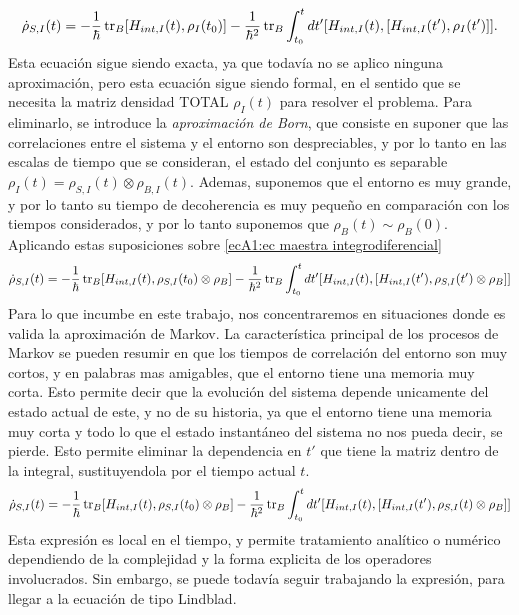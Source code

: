 \begin{equation}
    \dot \rho_{S,I}(t)=-\frac{1}{\hbar}\tr_B[H_{int,I}(t),\rho_I(t_0)]-\frac{1}{\hbar^2} \tr_B \int_{t_0}^{t}dt' [H_{int,I}(t),[H_{int,I}(t'),\rho_{I}(t')]].
\end{equation}
Esta ecuación sigue siendo exacta, ya que todavía no se aplico ninguna aproximación, pero esta ecuación sigue siendo formal, en el sentido que se necesita la matriz densidad TOTAL $\rho_I(t)$ para resolver el problema. Para eliminarlo, se introduce la \textit{aproximación de Born}, que consiste en suponer que las correlaciones entre el sistema y el entorno son despreciables, y por lo tanto en las escalas de tiempo que se consideran, el estado del conjunto es separable $\rho_I(t)=\rho_{S,I}(t)\otimes\rho_{B,I}(t)$. Ademas, suponemos que el entorno es muy grande, y por lo tanto su tiempo de decoherencia es muy pequeño en comparación con los tiempos considerados, y por lo tanto suponemos que $\rho_B(t)\sim\rho_B(0)$. Aplicando estas suposiciones sobre \ref{ecA1:ec maestra integrodiferencial}
\begin{equation}
    \dot \rho_{S,I}(t)=-\frac{1}{\hbar}\tr_B[H_{int,I}(t),\rho_{S,I}(t_0)\otimes \rho_B]-\frac{1}{\hbar^2} \tr_B \int_{t_0}^{t}dt' [H_{int,I}(t),[H_{int,I}(t'),\rho_{S,I}(t')\otimes \rho_B]]
\end{equation}
Para lo que incumbe en este trabajo, nos concentraremos en situaciones donde es valida la aproximación de Markov. La característica principal de los procesos de Markov se pueden resumir en que los tiempos de correlación del entorno son muy cortos, y en palabras mas amigables, que el entorno tiene una memoria muy corta. Esto permite decir que la evolución del sistema depende unicamente del estado actual de este, y no de su historia, ya que el entorno tiene una memoria muy corta y todo lo que el estado instantáneo del sistema no nos pueda decir, se pierde. Esto permite eliminar la dependencia en $t'$ que tiene la matriz dentro de la integral, sustituyendola por el tiempo actual $t$.
\begin{equation}
    \dot \rho_{S,I}(t)=-\frac{1}{\hbar}\tr_B[H_{int,I}(t),\rho_{S,I}(t_0)\otimes \rho_B]-\frac{1}{\hbar^2} \tr_B \int_{t_0}^{t}dt' [H_{int,I}(t),[H_{int,I}(t'),\rho_{S,I}(t)\otimes \rho_B]]
    \label{ecA1:ec markov}
\end{equation}
Esta expresión es local en el tiempo, y permite tratamiento analítico o numérico dependiendo de la complejidad y la forma explicita de los operadores involucrados. Sin embargo, se puede todavía seguir trabajando la expresión, para llegar a la ecuación de tipo Lindblad. 

